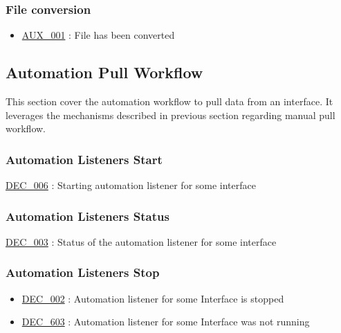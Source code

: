\documentclass[dec_sum_main.tex]{subfiles}
\begin{document}
\subsubsection{File conversion}
 \newline
\begin{itemize}
    \item \hyperref[AUX001]{AUX\_001} : File has been converted
\end{itemize}

\subsection{Automation Pull Workflow}
This section cover the automation workflow to pull data from an interface. It leverages the mechanisms described in previous section regarding manual pull workflow.

\subsubsection{Automation Listeners Start}
 \newline
\noindent

\hyperref[DEC006]{DEC\_006} : Starting automation listener for some interface

\subsubsection{Automation Listeners Status}
 \newline

\hyperref[DEC003]{DEC\_003} : Status of the automation listener for some interface


\subsubsection{Automation Listeners Stop}

\begin{itemize}
    \item \hyperref[DEC002]{DEC\_002} : Automation listener for some Interface is stopped
    \item \hyperref[DEC603]{DEC\_603} : Automation listener for some Interface was not running
\end{itemize}
\end{document}
